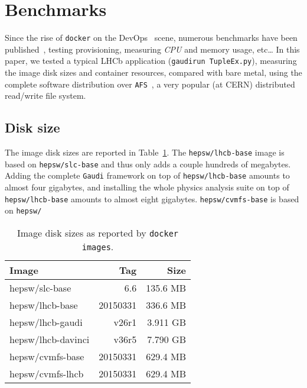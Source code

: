 \documentclass[a4paper]{jpconf}
\begin{document}
\section{Benchmarks}
Since the rise of \texttt{docker} on the DevOps~\cite{ref-devops} scene, numerous benchmarks have
been published~\cite{ref-bench-0,ref-bench-1}, testing provisioning, measuring
\emph{CPU} and memory usage, etc\ldots
In this paper, we tested a typical LHCb application (\texttt{gaudirun
TupleEx.py}), measuring the image disk sizes and container resources, compared
with bare metal, using the complete software distribution over
\texttt{AFS}~\cite{ref-afs}, a very popular (at CERN) distributed read/write file system.

\subsection{Disk size}
The image disk sizes are reported in Table~\ref{table-disk-sizes}.
The \texttt{hepsw/lhcb-base} image is based on \texttt{hepsw/slc-base} and thus
only adds a couple hundreds of megabytes.
Adding the complete \texttt{Gaudi} framework on top of \texttt{hepsw/lhcb-base}
amounts to almost four gigabytes, and installing the whole physics analysis
suite on top of \texttt{hepsw/lhcb-base} amounts to almost eight gigabytes.
\texttt{hepsw/cvmfs-base} is based on \texttt{hepsw/}

\begin{table}[h]
\begin{center}
  \begin{tabular}{ l | r | r }
Image & Tag & Size \\

\hline
hepsw/slc-base     &      6.6 & 135.6 MB \\
hepsw/lhcb-base    & 20150331 & 336.6 MB \\
hepsw/lhcb-gaudi   &    v26r1 & 3.911 GB \\
hepsw/lhcb-davinci &    v36r5 & 7.790 GB \\

\hline
hepsw/cvmfs-base & 20150331 & 629.4 MB \\
hepsw/cvmfs-lhcb & 20150331 & 629.4 MB \\

\hline
\end{tabular}
\end{center}
\caption{\label{table-disk-sizes}Image disk sizes as reported by \texttt{docker
images}.}
\end{table}
\end{document}
